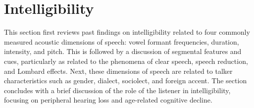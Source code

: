 
\section{Intelligibility}
This section first reviews past findings on intelligibility related to four commonly measured acoustic dimensions of speech: vowel formant frequencies, duration, intensity, and pitch.  This is followed by a discussion of segmental features and cues, particularly as related to the phenomena of clear speech, speech reduction, and Lombard effects.  Next, these dimensions of speech are related to talker characteristics such as gender, dialect, sociolect, and foreign accent.  The section concludes with a brief discussion of the role of the listener in intelligibility, focusing on peripheral hearing loss and age-related cognitive decline.%


